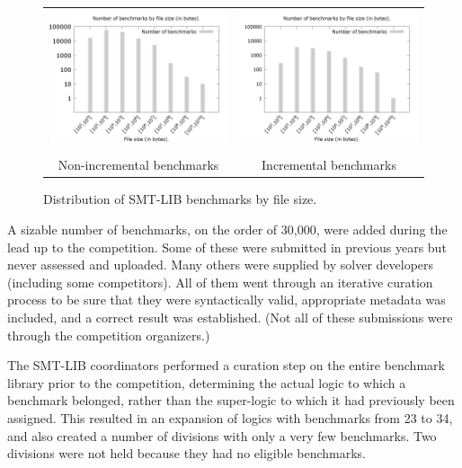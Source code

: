 \documentclass[twoside,11pt]{article}
\begin{document}
\begin{figure}
\centering
\begin{tabular}{cc}
\includegraphics[width=.47\textwidth]{smtlib2-file-count-by-size.png}
&
\includegraphics[width=.47\textwidth]{smtlib2-app-file-count-by-size.png}
\\
\\
Non-incremental benchmarks & Incremental benchmarks
\end{tabular}
\caption{Distribution of SMT-LIB benchmarks by file size.
\label{fig:smtlib-bysize}}
\end{figure}


A sizable number of benchmarks, on the order of 30,000, were added during the lead up to the competition. Some of these were submitted in previous years but never assessed and uploaded. Many others were supplied by solver developers (including some competitors). All of them went through an iterative curation process to be sure that they were syntactically valid, appropriate metadata was included, and a correct result was established. (Not all of these submissions were through the competition organizers.)

The SMT-LIB coordinators performed a curation step on the entire benchmark library prior to the competition, determining the actual logic to which a benchmark belonged, rather than the super-logic to which it had previously been assigned. This resulted in an expansion of logics with benchmarks from 23 to 34, and also created a number of divisions with only a very few benchmarks. Two divisions were not held because they had no eligible benchmarks.
\end{document}
